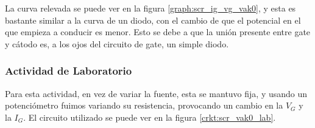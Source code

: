       La curva relevada se puede ver en la figura \ref{graph:scr_ig_vg_vak0}, y esta es bastante similar a la curva de
      un diodo, con el cambio de que el potencial en el que empieza a conducir es menor. Esto se debe a que la unión
      presente entre gate y cátodo es, a los ojos del circuito de gate, un simple diodo.

      \subsubsection{Actividad de Laboratorio}
        Para esta actividad, en vez de variar la fuente, esta se mantuvo fija, y usando un potenciómetro fuimos variando
        su resistencia, provocando un cambio en la $V_G$ y la $I_G$. El circuito utilizado se puede ver en la figura
        \ref{crkt:scr_vak0_lab}.

